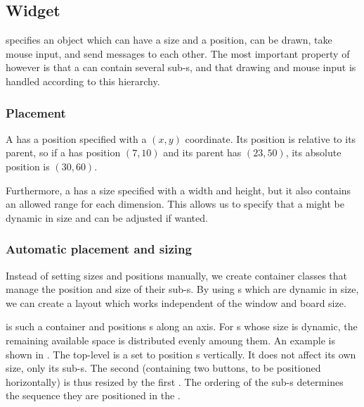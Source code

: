 

\subsection{Widget}
\label{sec:widget}

 specifies an object which can have a size and a position, can be
drawn, take mouse input, and send messages to each other. The most important
property of  however is that a  can contain
several sub-s, and that drawing and mouse input is handled
according to this hierarchy.


\subsubsection{Placement}

A  has a position specified with a $(x, y)$ coordinate. Its
position is relative to its parent, so if a  has position
$(7, 10)$ and its parent has $(23, 50)$, its absolute position is $(30, 60)$.

Furthermore, a  has a size specified with a width and height,
but it also contains an allowed range for each dimension. This allows us to
specify that a  might be dynamic in size and can be adjusted if
wanted.

\subsubsection{Automatic placement and sizing}

Instead of setting sizes and positions manually, we create container classes
that manage the position and size of their sub-s. By using
s which are dynamic in size, we can create a layout which works
independent of the window and board size.

 is such a container  and positions
s along an axis. For s whose size is dynamic,
the remaining available space is distributed evenly amoung them. An example is
shown in . The top-level  is a
 set to position s vertically. It does
not affect its own size, only its sub-s. The second
 (containing two buttons, to be positioned
horizontally) is thus resized by the first . The
ordering of the sub-s determines the sequence they are
positioned in the .

